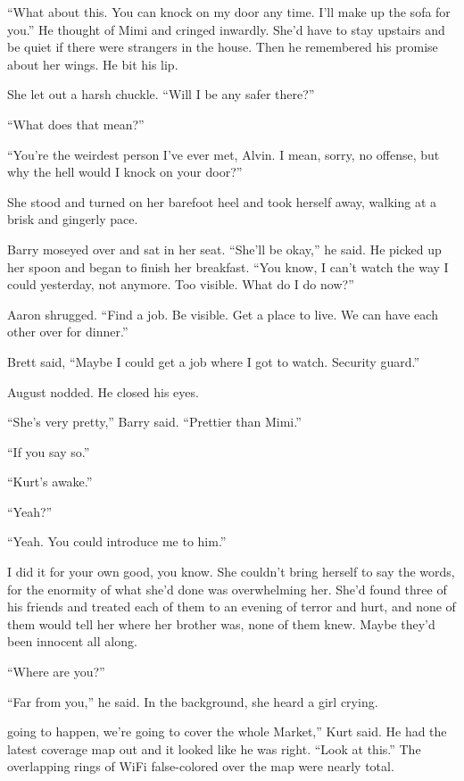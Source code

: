 ``What about this.  You can knock on my door any time.  I'll make up
the sofa for you.'' He thought of Mimi and cringed inwardly.  She'd
have to stay upstairs and be quiet if there were strangers in the
house.  Then he remembered his promise about her wings.  He bit his
lip.

She let out a harsh chuckle.  ``Will I be any safer there?''

``What does that mean?''

``You're the weirdest person I've ever met, Alvin.  I mean, sorry, no
offense, but why the hell would I knock on your door?''

She stood and turned on her barefoot heel and took herself away,
walking at a brisk and gingerly pace.

Barry moseyed over and sat in her seat.  ``She'll be okay,'' he said. 
He picked up her spoon and began to finish her breakfast.  ``You know,
I can't watch the way I could yesterday, not anymore.  Too visible. 
What do I do now?''

Aaron shrugged.  ``Find a job.  Be visible.  Get a place to live.  We
can have each other over for dinner.''

Brett said, ``Maybe I could get a job where I got to watch.  Security
guard.''

August nodded.  He closed his eyes.

``She's very pretty,'' Barry said.  ``Prettier than Mimi.''

``If you say so.''

``Kurt's awake.''

``Yeah?''

``Yeah.  You could introduce me to him.''

I did it for your own good, you know.  She couldn't bring herself to
say the words, for the enormity of what she'd done was overwhelming
her.  She'd found three of his friends and treated each of them to an
evening of terror and hurt, and none of them would tell her where her
brother was, none of them knew.  Maybe they'd been innocent all along.

``Where are you?''

``Far from you,'' he said.  In the background, she heard a girl
crying.

going to happen, we're going to cover the whole Market,'' Kurt
said.  He had the latest coverage map out and it looked like he was
right.  ``Look at this.'' The overlapping rings of WiFi false-colored
over the map were nearly total. 

